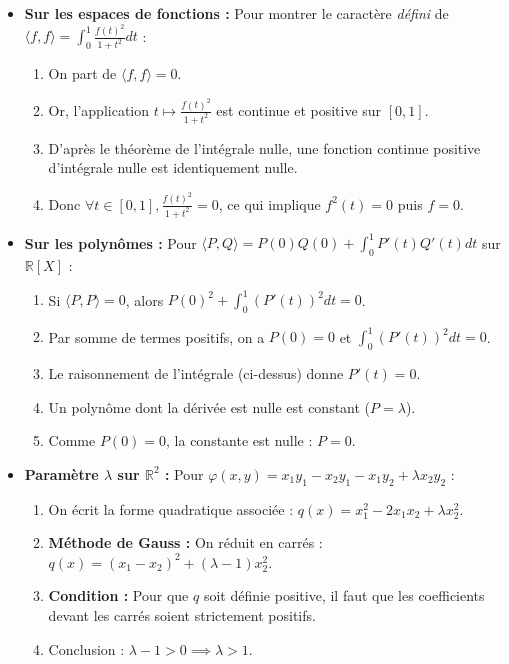 \documentclass[french]{yLectureNote}
\begin{document}
\begin{itemize}
    \item \textbf{Sur les espaces de fonctions :} Pour montrer le caractère \textit{défini} de $\langle f, f \rangle = \int_0^1 \frac{f(t)^2}{1+t^2} dt$ :
    \begin{enumerate}
        \item On part de $\langle f, f \rangle = 0$.
        \item Or, l'application $t \mapsto \frac{f(t)^2}{1+t^2}$ est continue et positive sur $[0,1]$.
        \item D'après le théorème de l'intégrale nulle, une fonction continue positive d'intégrale nulle est identiquement nulle.
        \item Donc $\forall t \in [0,1], \frac{f(t)^2}{1+t^2} = 0$, ce qui implique $f^2(t)=0$ puis $f=0$.
    \end{enumerate}

    \item \textbf{Sur les polynômes :} Pour $\langle P, Q \rangle = P(0)Q(0) + \int_0^1 P'(t)Q'(t) dt$ sur $\mathbb{R}[X]$ :
    \begin{enumerate}
        \item Si $\langle P, P \rangle = 0$, alors $P(0)^2 + \int_0^1 (P'(t))^2 dt = 0$.
        \item Par somme de termes positifs, on a $P(0) = 0$ et $\int_0^1 (P'(t))^2 dt = 0$.
        \item Le raisonnement de l'intégrale (ci-dessus) donne $P'(t) = 0$.
        \item Un polynôme dont la dérivée est nulle est constant ($P = \lambda$).
        \item Comme $P(0) = 0$, la constante est nulle : $P = 0$.
    \end{enumerate}

    \item \textbf{Paramètre $\lambda$ sur $\mathbb{R}^2$ :} Pour $\varphi(x,y) = x_1y_1 - x_2y_1 - x_1y_2 + \lambda x_2y_2$ :
    \begin{enumerate}
        \item On écrit la forme quadratique associée : $q(x) = x_1^2 - 2x_1x_2 + \lambda x_2^2$.
        \item \textbf{Méthode de Gauss :} On réduit en carrés : $q(x) = (x_1 - x_2)^2 + (\lambda - 1)x_2^2$.
        \item \textbf{Condition :} Pour que $q$ soit définie positive, il faut que les coefficients devant les carrés soient strictement positifs. 
        \item Conclusion : $\lambda - 1 > 0 \implies \lambda > 1$.
    \end{enumerate}
\end{itemize}
\end{document}
